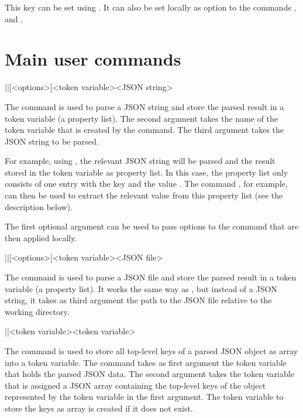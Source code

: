 \documentclass[a4paper]{article}
\begin{document}
{{This key can be set using \macro{\JSONParseSet}. It can also be set locally as option to the commands \macro{\JSONParseValue}, \macro{\JSONParseArrayValues} and \macro{\JSONParseArrayValuesMap}.

\section{Main user commands}

\begin{macrodef}
|\JSONParse|[<options>]{<token variable>}{<JSON string>}
\end{macrodef}
The command \macro{\JSONParse} is used to parse a JSON string and store the parsed result in a token variable (a property list). The second argument takes the name of the token variable that is created by the command. The third argument takes the JSON string to be parsed. 

For example, using , the relevant JSON string will be parsed and the result stored in the token variable \macro{\myJSONdata} as property list. In this case, the property list only consists of one entry with the key  and the value . The command , for example, can then be used to extract the relevant value from this property list (see the description below). 

The first optional argument can be used to pass options to the command that are then applied locally. 

\begin{macrodef}
|\JSONParseFromFile|[<options>]{<token variable>}{<JSON file>}
\end{macrodef}
The command \macro{\JSONParseFromFile} is used to parse a JSON file and store the parsed result in a token variable (a property list). It works the same way as \macro{\JSONParse}, but instead of a JSON string, it takes as third argument the path to the JSON file relative to the working directory.

\begin{macrodef}
|\JSONParseKeys|{<token variable>}{<token variable>}
\end{macrodef}
The command \macro{\JSONParseKeys} is used to store all top-level keys of a parsed JSON object as array into a token variable. The command takes as first argument the token variable that holds the parsed JSON data. The second argument takes the token variable that is assigned a JSON array containing the top-level keys of the object represented by the token variable in the first argument. The token variable to store the keys as array is created if it does not exist.

}}
\end{document}
